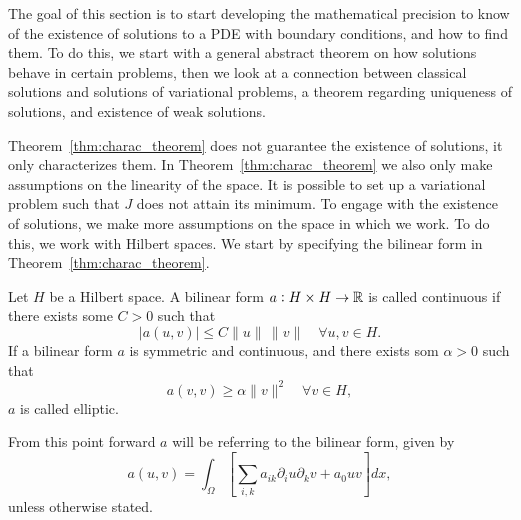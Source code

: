 The goal of this section is to start developing the mathematical 
precision to know of the existence of solutions to a PDE with boundary conditions, and how to find 
them. 
To do this, we start with a general abstract theorem on how solutions 
behave in certain problems, then we look at a connection between 
classical solutions and solutions of variational problems, a 
theorem regarding uniqueness of solutions, and existence of 
weak solutions.


Theorem~\ref{thm:charac_theorem} does not guarantee the existence 
of solutions, it only characterizes them. In Theorem~\ref{thm:charac_theorem} we 
also only make assumptions on the linearity of the space. 
It is possible to set up a variational problem such that $J$ does 
not attain its minimum.
To engage with the existence of solutions, we make more assumptions on 
the space in which we work. To do this, we work with Hilbert spaces. 
We start by specifying the bilinear form in Theorem~\ref{thm:charac_theorem}.
\begin{defn}{\quad}
   Let $H$ be a Hilbert space. A bilinear form $a : H \times H \to \mathbb{R}$ is 
   called continuous if there exists some $C > 0$ such that 
   \begin{equation}
    |a(u,v)| \leq C \|u\|\, \|v\| \quad \forall u,v \in H.
   \end{equation} 
   If a bilinear form $a$ is symmetric and continuous, and there exists som $\alpha >0$ such that 
   \begin{equation*}
    a(v,v) \geq \alpha \|v\|^2 \quad \forall v \in H,
   \end{equation*}
   $a$ is called elliptic.\label{def:elliptic}
 \end{defn}
From this point forward $a$ will be referring to the bilinear form, given by
\begin{equation}
   a(u,v) = \int_\Omega \left[\sum_{i,k} a_{ik}\partial_i u\partial_k v+a_0uv\right]dx,
\end{equation}
unless otherwise stated.




